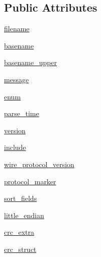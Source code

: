 \subsection*{Public Attributes}
\begin{DoxyCompactItemize}
\item 
\mbox{\hyperlink{classpymavlink_1_1generator_1_1mavparse_1_1MAVXML_a59d0d9fce063d07328bfee55ab32e1d4}{filename}}
\item 
\mbox{\hyperlink{classpymavlink_1_1generator_1_1mavparse_1_1MAVXML_a63487b7b29e52e2ac80c0db2af278241}{basename}}
\item 
\mbox{\hyperlink{classpymavlink_1_1generator_1_1mavparse_1_1MAVXML_a7d1402da18b05bd56a136a04d9152b82}{basename\+\_\+upper}}
\item 
\mbox{\hyperlink{classpymavlink_1_1generator_1_1mavparse_1_1MAVXML_a8bf9e5315a161003dfbfb48090ba189f}{message}}
\item 
\mbox{\hyperlink{classpymavlink_1_1generator_1_1mavparse_1_1MAVXML_ad36eb40ff469991a0e47c1c6f00a6ed7}{enum}}
\item 
\mbox{\hyperlink{classpymavlink_1_1generator_1_1mavparse_1_1MAVXML_acfbeb3e7f32b315d6879d793b5d5da33}{parse\+\_\+time}}
\item 
\mbox{\hyperlink{classpymavlink_1_1generator_1_1mavparse_1_1MAVXML_a79d2161209a9093e5fec4f3bf81108e8}{version}}
\item 
\mbox{\hyperlink{classpymavlink_1_1generator_1_1mavparse_1_1MAVXML_ad4a2a0bb2b7ef5a1d39caf935ecacb72}{include}}
\item 
\mbox{\hyperlink{classpymavlink_1_1generator_1_1mavparse_1_1MAVXML_aadee007638f018e0c610f67157ea8cad}{wire\+\_\+protocol\+\_\+version}}
\item 
\mbox{\hyperlink{classpymavlink_1_1generator_1_1mavparse_1_1MAVXML_a2dd7f2cf927b388ac42c9b09e50f6b0e}{protocol\+\_\+marker}}
\item 
\mbox{\hyperlink{classpymavlink_1_1generator_1_1mavparse_1_1MAVXML_a19481f47f29be685fc428fd78321f055}{sort\+\_\+fields}}
\item 
\mbox{\hyperlink{classpymavlink_1_1generator_1_1mavparse_1_1MAVXML_aabef44240e07ee21af6aee78ddca34a6}{little\+\_\+endian}}
\item 
\mbox{\hyperlink{classpymavlink_1_1generator_1_1mavparse_1_1MAVXML_a9ec219c2fba65e9fcc45d87658e3b9d4}{crc\+\_\+extra}}
\item 
\mbox{\hyperlink{classpymavlink_1_1generator_1_1mavparse_1_1MAVXML_a78e9ed205142f851e53e80010dbc64e0}{crc\+\_\+struct}}
\item 

\end{DoxyCompactItemize}
